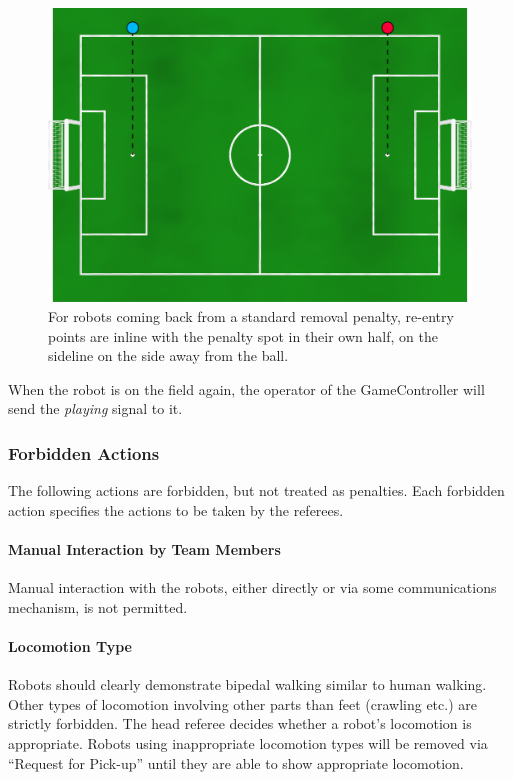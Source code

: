 \begin{figure}[t]
	\centerline{\includegraphics[width=\columnwidth]{figs/penalty_re-entry_points_2020.png}}
	\caption{For robots coming back from a standard removal penalty, re-entry points  are inline with the penalty spot in their own half, on the sideline on the side away from the ball.}
	\label{fig:penalty_re-entry_points}
\end{figure}

When the robot is on the field again, the operator of the GameController will send the \emph{playing} signal to it.

\subsubsection{Forbidden Actions}

The following actions are forbidden, but not treated as penalties.
Each forbidden action specifies the actions to be taken by the referees.

\paragraph{Manual Interaction by Team Members}

Manual interaction with the robots, either directly or via some communications mechanism, is not permitted.

\paragraph{Locomotion Type}
\label{sec:locomotion_type}

Robots should clearly demonstrate bipedal walking similar to human walking. Other types of locomotion involving other parts than feet (crawling etc.) are strictly forbidden.
The head referee decides whether a robot's locomotion is appropriate. Robots using inappropriate locomotion types will be removed via ``Request for Pick-up'' until they are able to show appropriate locomotion.

